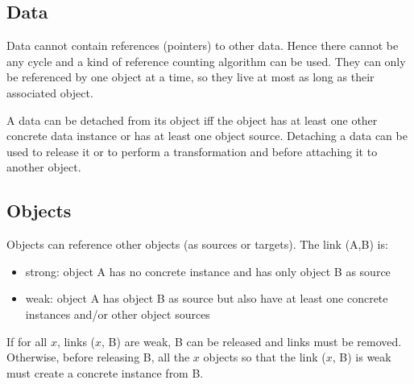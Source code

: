 \documentclass[twocolumn]{article}
\begin{document}
\subsection{Data}

Data cannot contain references (pointers) to other data. Hence there cannot be
any cycle and a kind of reference counting algorithm can be used. They can only
be referenced by one object at a time, so they live at most as long as their
associated object.

A data can be detached from its object iff the object has at least one other
concrete data instance or has at least one object source. Detaching a data can
be used to release it or to perform a transformation and before attaching it to
another object.

\subsection{Objects}

Objects can reference other objects (as sources or targets). The link (A,B) is:
\begin{itemize}
   \item strong: object A has no concrete instance and has only object B as
   source
   \item weak: object A has object B as source but also have at least one concrete
   instances and/or other object sources
\end{itemize}

If for all $x$, links ($x$, B) are weak, B can be released and links must be
removed. Otherwise, before releasing B, all the $x$ objects so that the link
($x$, B) is weak must create a concrete instance from B.
\end{document}
